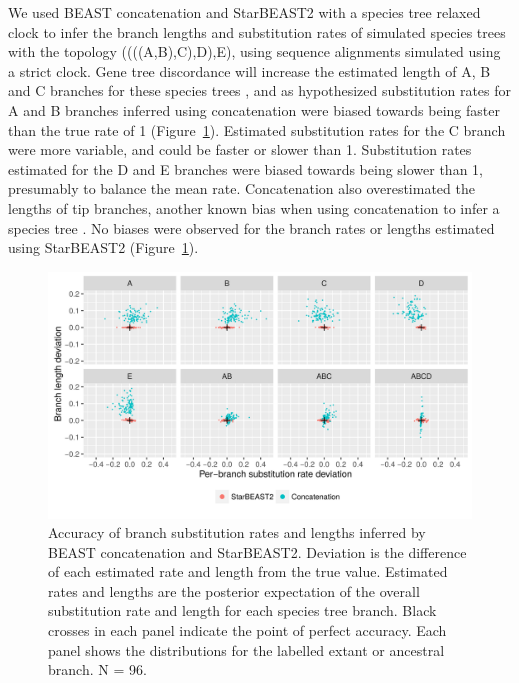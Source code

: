 \documentclass[12pt]{article}
\begin{document}
We used BEAST concatenation and StarBEAST2 with a species tree relaxed clock
to infer the branch lengths and substitution rates of simulated species trees
with the topology ((((A,B),C),D),E), using sequence alignments simulated using
a strict clock. Gene tree discordance will increase the estimated length of A,
B and C branches for these species trees \citep{Mendes01072016}, and as
hypothesized substitution rates for A and B branches inferred using
concatenation were biased towards being faster than the true rate of 1
(Figure~\ref{fig:spilsRates}). Estimated substitution rates for the C branch
were more variable, and could be faster or slower than 1. Substitution rates
estimated for the D and E branches were biased towards being slower than 1,
presumably to balance the mean rate. Concatenation also overestimated the
lengths of tip branches, another known bias when using concatenation to infer
a species tree \citep{Ogilvie01052016}. No biases were observed for the branch
rates or lengths estimated using StarBEAST2 (Figure~\ref{fig:spilsRates}).

\begin{figure}[htb!]
\centering
\includegraphics[width=\textwidth]{scatter.png}
\caption
{Accuracy of branch substitution rates and lengths inferred by BEAST
concatenation and StarBEAST2. Deviation is the difference of each estimated
rate and length from the true value. Estimated rates and lengths are the
posterior expectation of the overall substitution rate and length for each
species tree branch. Black crosses in each panel indicate the point of perfect
accuracy. Each panel shows the distributions for the labelled extant or
ancestral branch. N = 96.}
\label{fig:spilsRates}
\end{figure}
\end{document}
